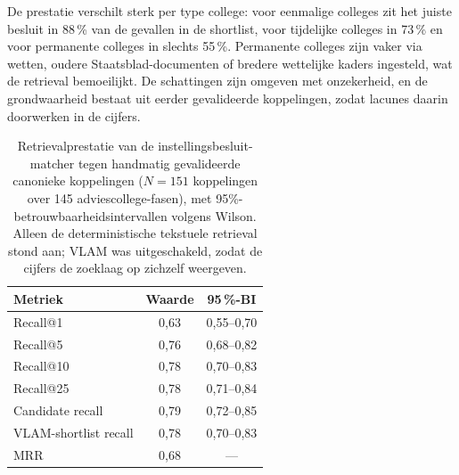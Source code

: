 \noindent De prestatie verschilt sterk per type college: voor eenmalige colleges
zit het juiste besluit in 88\,\% van de gevallen in de shortlist, voor tijdelijke
colleges in 73\,\% en voor permanente colleges in slechts 55\,\%. Permanente
colleges zijn vaker via wetten, oudere Staatsblad-documenten of bredere
wettelijke kaders ingesteld, wat de retrieval bemoeilijkt. De schattingen zijn
omgeven met onzekerheid, en de grondwaarheid bestaat uit eerder gevalideerde
koppelingen, zodat lacunes daarin doorwerken in de cijfers.

\begin{table}[htbp]
\centering
\caption{Retrievalprestatie van de instellingsbesluit-matcher tegen handmatig
gevalideerde canonieke koppelingen ($N = 151$ koppelingen over 145
adviescollege-fasen), met 95\%-betrouwbaarheidsintervallen volgens Wilson. Alleen
de deterministische tekstuele retrieval stond aan; VLAM was uitgeschakeld, zodat
de cijfers de zoeklaag op zichzelf weergeven.}
\label{tab:dv1-instelling-retrieval}
\footnotesize
\begin{tabular}{@{}lcc@{}}
\toprule
Metriek & Waarde & 95\,\%-BI \\
\midrule
Recall@1               & 0,63 & 0,55--0,70 \\
Recall@5               & 0,76 & 0,68--0,82 \\
Recall@10              & 0,78 & 0,70--0,83 \\
Recall@25              & 0,78 & 0,71--0,84 \\
Candidate recall       & 0,79 & 0,72--0,85 \\
VLAM-shortlist recall  & 0,78 & 0,70--0,83 \\
MRR                    & 0,68 & --- \\
\bottomrule
\end{tabular}
\end{table}
